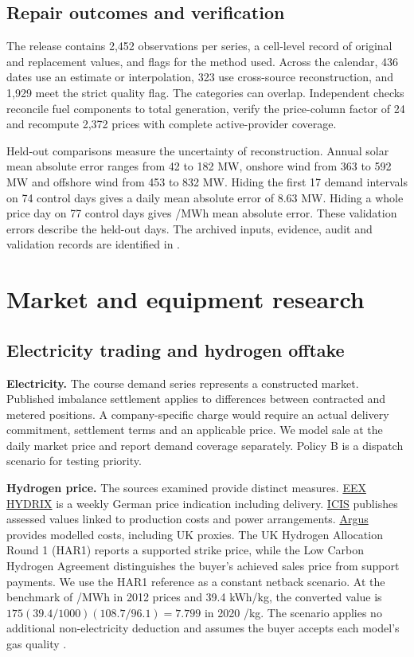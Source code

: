 \section{Repair outcomes and verification}
The release contains 2,452 observations per series, a cell-level record
of original and replacement values, and flags for the method used.
Across the calendar, 436 dates use an estimate or interpolation,
323 use cross-source reconstruction, and 1,929 meet the strict
quality flag. The categories can overlap. Independent checks reconcile
fuel components to total generation, verify the price-column factor of
24 and recompute 2,372 prices with complete active-provider coverage.

Held-out comparisons measure the uncertainty of reconstruction. Annual
solar mean absolute error ranges from 42 to 182 MW, onshore wind from
363 to 592 MW and offshore wind from 453 to 832 MW. Hiding the first
17 demand intervals on 74 control days gives a daily mean absolute
error of 8.63 MW. Hiding a whole price day on 77 control days gives
/MWh mean absolute error. These validation errors describe
the held-out days. The archived inputs, evidence, audit and validation
records are identified in \cite{repair}.

\chapter{Market and equipment research}\label{app:research}
\section{Electricity trading and hydrogen offtake}
\textbf{Electricity.}
The course demand series represents a constructed market. Published
imbalance settlement applies to differences between contracted and metered
positions. A company-specific charge would require an actual delivery
commitment, settlement terms and an applicable price. We model sale at
the daily market price and report demand coverage separately. Policy B
is a dispatch scenario for testing priority.

\textbf{Hydrogen price.}
The sources examined provide distinct measures.
\href{https://www.eex.com/en/markets/hydrogen}{EEX HYDRIX} is a weekly
German price indication including delivery.
\href{https://www.icis.com/explore/resources/news/2022/09/27/10810133/icis-launches-europe-s-first-market-linked-renewable-hydrogen-assessments/}{ICIS}
publishes assessed values linked to production costs and power arrangements.
\href{https://www.argusmedia.com/en/solutions/products/argus-hydrogen-and-future-fuels}{Argus}
provides modelled costs, including UK proxies. The UK Hydrogen Allocation Round 1
(HAR1) reports a supported strike price, while the Low Carbon Hydrogen
Agreement distinguishes the buyer's achieved sales price from support
payments. We use the HAR1 reference as a constant netback scenario.
At the benchmark of /MWh in 2012 prices and 39.4 kWh/kg, the
converted value is \(175(39.4/1000)(108.7/96.1)=7.799\) in
2020 \gbp/kg. The scenario applies no additional non-electricity
deduction and assumes the buyer accepts each model's gas quality
\cite{har,cpi,basis,v6}.

